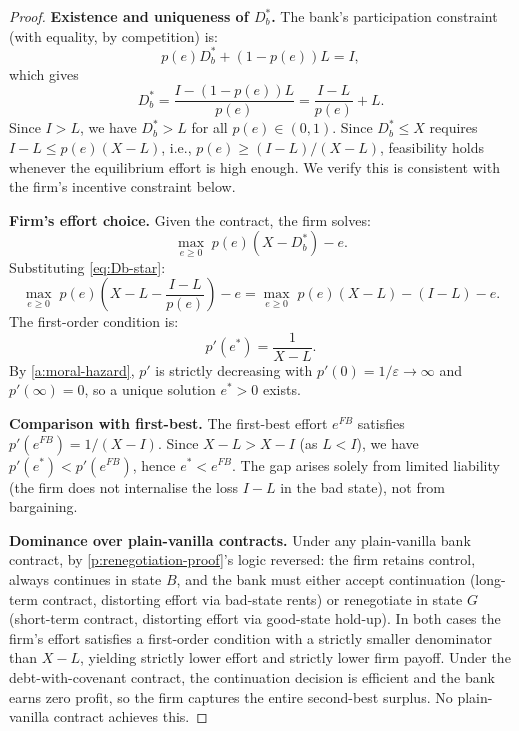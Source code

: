 \documentclass[12pt,a4paper]{article}
\theoremstyle{plain}
\theoremstyle{definition}
\theoremstyle{remark}
\begin{document}
\begin{proof}
\textbf{Existence and uniqueness of $D_b^*$.} The bank's participation constraint (with equality, by competition) is:
\begin{equation}
\label{eq:bank-pc}
p(e) D_b^* + (1 - p(e)) L = I,
\end{equation}
which gives
\begin{equation}
\label{eq:Db-star}
D_b^* = \frac{I - (1-p(e))L}{p(e)} = \frac{I - L}{p(e)} + L.
\end{equation}
Since $I > L$, we have $D_b^* > L$ for all $p(e) \in (0,1)$. Since $D_b^* \leq X$ requires $I - L \leq p(e)(X - L)$, i.e., $p(e) \geq (I-L)/(X-L)$, feasibility holds whenever the equilibrium effort is high enough. We verify this is consistent with the firm's incentive constraint below.

\textbf{Firm's effort choice.} Given the contract, the firm solves:
\begin{equation}
\label{eq:firm-effort}
\max_{e \geq 0} \; p(e)(X - D_b^*) - e.
\end{equation}
Substituting \cref{eq:Db-star}:
\begin{equation}
\label{eq:firm-effort-sub}
\max_{e \geq 0} \; p(e)\!\left(X - L - \frac{I-L}{p(e)}\right) - e = \max_{e \geq 0} \; p(e)(X-L) - (I-L) - e.
\end{equation}
The first-order condition is:
\begin{equation}
\label{eq:foc-covenant}
p'(e^*) = \frac{1}{X - L}.
\end{equation}
By \cref{a:moral-hazard}, $p'$ is strictly decreasing with $p'(0) = 1/\varepsilon \to \infty$ and $p'(\infty) = 0$, so a unique solution $e^* > 0$ exists.

\textbf{Comparison with first-best.} The first-best effort $e^{FB}$ satisfies $p'(e^{FB}) = 1/(X - I)$. Since $X - L > X - I$ (as $L < I$), we have $p'(e^*) < p'(e^{FB})$, hence $e^* < e^{FB}$. The gap arises solely from limited liability (the firm does not internalise the loss $I - L$ in the bad state), not from bargaining.

\textbf{Dominance over plain-vanilla contracts.} Under any plain-vanilla bank contract, by \cref{p:renegotiation-proof}'s logic reversed: the firm retains control, always continues in state $B$, and the bank must either accept continuation (long-term contract, distorting effort via bad-state rents) or renegotiate in state $G$ (short-term contract, distorting effort via good-state hold-up). In both cases the firm's effort satisfies a first-order condition with a strictly smaller denominator than $X - L$, yielding strictly lower effort and strictly lower firm payoff. Under the debt-with-covenant contract, the continuation decision is efficient and the bank earns zero profit, so the firm captures the entire second-best surplus. No plain-vanilla contract achieves this.


\end{proof}
\end{document}

